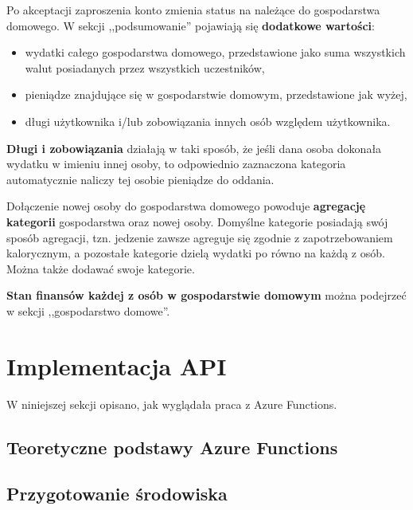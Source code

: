 \documentclass[12pt,a4paper,twoside,titlepage,openright]{book}
\begin{document}
Po akceptacji zaproszenia konto zmienia status na należące do gospodarstwa domowego. W sekcji ,,podsumowanie'' pojawiają się \textbf{dodatkowe wartości}:

\begin{itemize}
\item wydatki całego gospodarstwa domowego, przedstawione jako suma wszystkich walut posiadanych przez wszystkich uczestników,
\item pieniądze znajdujące się w gospodarstwie domowym, przedstawione jak wyżej,
\item długi użytkownika i/lub zobowiązania innych osób względem użytkownika.
\end{itemize}

\textbf{Długi i zobowiązania} działają w taki sposób, że jeśli dana osoba dokonała wydatku w imieniu innej osoby, to odpowiednio zaznaczona kategoria automatycznie naliczy tej osobie pieniądze do oddania.

Dołączenie nowej osoby do gospodarstwa domowego powoduje \textbf{agregację kategorii} gospodarstwa oraz nowej osoby. Domyślne kategorie posiadają swój sposób agregacji, tzn. jedzenie zawsze agreguje się zgodnie z zapotrzebowaniem kalorycznym, a pozostałe kategorie dzielą wydatki po równo na każdą z osób. Można także dodawać swoje kategorie.

\textbf{Stan finansów każdej z osób w gospodarstwie domowym} można podejrzeć w sekcji ,,gospodarstwo domowe''.


\section{Implementacja API}


W niniejszej sekcji opisano, jak wyglądała praca z Azure Functions.

\subsection{Teoretyczne podstawy Azure Functions}



\subsection{Przygotowanie środowiska}
\end{document}
